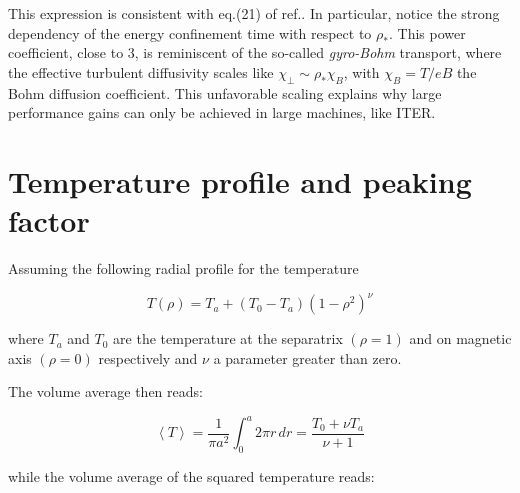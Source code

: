 This expression is consistent with eq.(21) of ref.\cite{ITERphysics_chap2}. In particular, notice the strong dependency of the energy confinement time with respect to $\rho_*$. This power coefficient, close to 3, is reminiscent of the so-called \emph{gyro-Bohm} transport, where the effective turbulent diffusivity scales like $\chi_\perp \sim \rho_* \chi_{B}$, with $\chi_B = T/eB$ the Bohm diffusion coefficient. This unfavorable scaling explains why large performance gains can only be achieved in large machines, like ITER.

\chapter{Temperature profile and peaking factor}
\label{appendix:peaking_factor}
Assuming the following radial profile for the temperature

\begin{equation}
    T(\rho) = T_a + (T_0 - T_a)(1 - \rho^2)^\nu
\end{equation}

where $T_a$ and $T_0$ are the temperature at the separatrix $(\rho=1)$ and on magnetic axis $(\rho=0)$ respectively and $\nu$ a parameter greater than zero.

The volume average then reads:

\begin{equation}
    \left < T \right > = \frac{1}{\pi a^2} \int_0^a 2\pi r \, dr = \frac{T_0 + \nu T_a}{\nu + 1} 
\end{equation}

while the volume average of the squared temperature reads:

